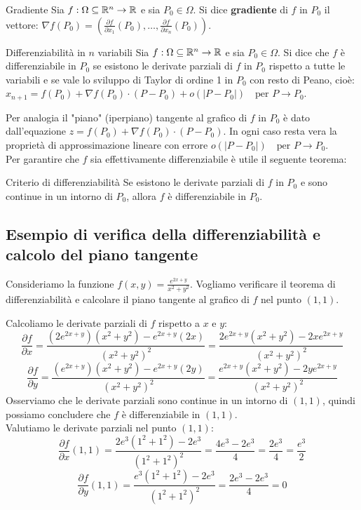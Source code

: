 \begin{definizione}{Gradiente}
Sia $f:\Omega \subseteq \mathbb{R}^n \rightarrow \mathbb{R}$ e sia $P_0 \in \Omega$. Si dice \textbf{gradiente} di $f$ in $P_0$ il vettore: $\nabla f(P_0)=\left(\frac{\partial f}{\partial x_1}(P_0), \dots, \frac{\partial f}{\partial x_n}(P_0)\right)$.
\end{definizione}

\begin{definizione}{Differenziabilità in $n$ variabili}
Sia $f:\Omega \subseteq \mathbb{R}^n \rightarrow \mathbb{R}$ e sia $P_0 \in \Omega$. Si dice che $f$ è differenziabile in $P_0$ se esistono le derivate parziali di $f$ in $P_0$ rispetto a tutte le variabili e se vale lo sviluppo di Taylor di ordine 1 in $P_0$ con resto di Peano, cioè: $x_{n+1}=f(P_0)+\nabla f(P_0)\cdot (P - P_0)+o(|P-P_0|) \quad \text{per } P \rightarrow P_0$.
\end{definizione}

Per analogia il "piano" (iperpiano) tangente al grafico di $f$ in $P_0$ è dato dall'equazione $z=f(P_0)+\nabla f(P_0)\cdot (P - P_0)$. In ogni caso resta vera la proprietà di approssimazione lineare con errore $o(|P-P_0|) \quad \text{per } P \rightarrow P_0$.\\

Per garantire che $f$ sia effettivamente differenziabile è utile il seguente teorema:
\begin{teorema}{Criterio di differenziabilità}
Se esistono le derivate parziali di $f$ in $P_0$ e sono continue in un intorno di $P_0$, allora $f$ è differenziabile in $P_0$.
\end{teorema}

\subsection{Esempio di verifica della differenziabilità e calcolo del piano tangente}
Consideriamo la funzione $f(x,y) = \frac{e^{2x+y}}{x^2+y^2}$. Vogliamo verificare il teorema di differenziabilità e calcolare il piano tangente al grafico di $f$ nel punto $(1,1)$.

Calcoliamo le derivate parziali di $f$ rispetto a $x$ e $y$:
\[
\frac{\partial f}{\partial x} = \frac{(2e^{2x+y})(x^2+y^2) - e^{2x+y}(2x)}{(x^2+y^2)^2} = \frac{2e^{2x+y}(x^2+y^2) - 2xe^{2x+y}}{(x^2+y^2)^2}
\]
\[
\frac{\partial f}{\partial y} = \frac{(e^{2x+y})(x^2+y^2) - e^{2x+y}(2y)}{(x^2+y^2)^2} = \frac{e^{2x+y}(x^2+y^2) - 2ye^{2x+y}}{(x^2+y^2)^2}
\]
Osserviamo che le derivate parziali sono continue in un intorno di $(1,1)$, quindi possiamo concludere che $f$ è differenziabile in $(1,1)$.\\
Valutiamo le derivate parziali nel punto $(1,1)$:
\[
\frac{\partial f}{\partial x}(1,1) = \frac{2e^{3}(1^2+1^2) - 2e^{3}}{(1^2+1^2)^2} = \frac{4e^{3} - 2e^{3}}{4} = \frac{2e^{3}}{4} = \frac{e^{3}}{2}
\]
\[
\frac{\partial f}{\partial y}(1,1) = \frac{e^{3}(1^2+1^2) - 2e^{3}}{(1^2+1^2)^2} = \frac{2e^{3} - 2e^{3}}{4} = 0
\]

